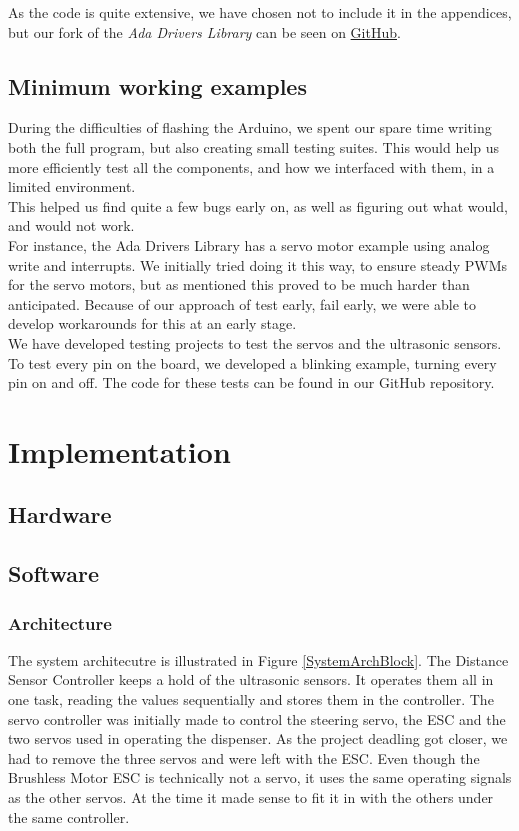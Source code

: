 \documentclass{article}
\begin{document}
As the code is quite extensive, we have chosen not to include it in the appendices, but our fork of the \textit{Ada Drivers Library} can be seen on \href{https://github.com/Stykk-Gruppen/Ada_Drivers_Library}{GitHub}.

\subsection{Minimum working examples}

During the difficulties of flashing the Arduino, we spent our spare time writing both the full program, but also creating small testing suites. This would help us more efficiently test all the components, and how we interfaced with them, in a limited environment.\\ 

This helped us find quite a few bugs early on, as well as figuring out what would, and would not work.\\

For instance, the Ada Drivers Library has a servo motor example using analog write and interrupts. We initially tried doing it this way, to ensure steady PWMs for the servo motors, but as mentioned this proved to be much harder than anticipated. Because of our approach of test early, fail early, we were able to develop workarounds for this at an early stage.\\ 

We have developed testing projects to test the servos and the ultrasonic sensors. To test every pin on the board, we developed a blinking example, turning every pin on and off. The code for these tests can be found in our GitHub repository.

\section{Implementation}

\subsection{Hardware}

\subsection{Software}

\subsubsection{Architecture}
The system architecutre is illustrated in Figure \ref{SystemArchBlock}. The Distance Sensor Controller keeps a hold of the ultrasonic sensors. It operates them all in one task, reading the values sequentially and stores them in the controller. The servo controller was initially made to control the steering servo, the ESC and the two servos used in operating the dispenser. As the project deadling got closer, we had to remove the three servos and were left with the ESC. Even though the Brushless Motor ESC is technically not a servo, it uses the same operating signals as the other servos. At the time it made sense to fit it in with the others under the same controller.\\
\end{document}
